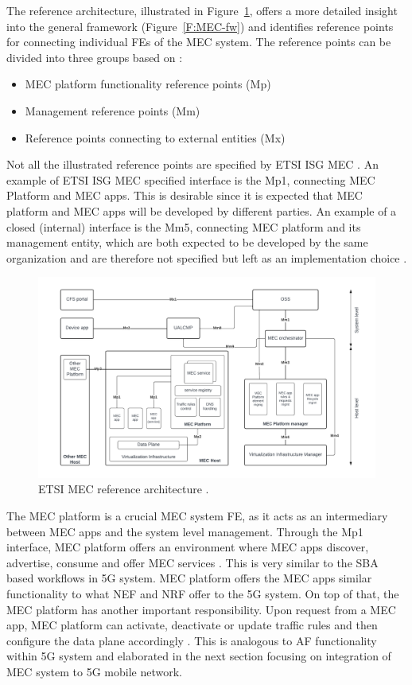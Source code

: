 \documentclass[12pt,a4paper,twoside]{report}
\begin{document}
The reference architecture, illustrated in Figure~\ref{F:MEC-ref-arch}, offers a more detailed insight into the general framework (Figure~\ref{F:MEC-fw}) and identifies reference points for connecting individual FEs of the MEC system. The reference points can be divided into three groups based on \cite{ETSI:GS:MEC003}: 
\begin{itemize}
	\item MEC platform functionality reference points (Mp) 
	\item Management reference points (Mm)
	\item Reference points connecting to external entities (Mx)
\end{itemize}
Not all the illustrated reference points are specified by ETSI ISG MEC \cite{ETSI:GS:MEC003}. An example of ETSI ISG MEC specified interface is the Mp1, connecting MEC Platform and MEC apps. This is desirable since it is expected that MEC platform and MEC apps will be developed by different parties. An example of a closed (internal) interface is the Mm5, connecting MEC platform and its management entity, which are both expected to be developed by the same organization and are therefore not specified but left as an implementation choice \cite{sabella-mec-sw-dev,ETSI:GS:MEC003}. 

\begin{figure}[ht]
	\centering
	\includegraphics[width=\textwidth]{./images/MEC-ref-arch.pdf}
	\caption{ETSI MEC reference architecture \cite{ETSI:GS:MEC003}.}
	\label{F:MEC-ref-arch}
\end{figure}

The MEC platform is a crucial MEC system FE, as it acts as an intermediary between MEC apps and the system level management. Through the Mp1 interface, MEC platform offers an environment where MEC apps discover, advertise, consume and offer MEC services \cite{ETSI:GS:app-ena}. This is very similar to the SBA based workflows in 5G system. MEC platform offers the MEC apps similar functionality to what NEF and NRF offer to the 5G system. On top of that, the MEC platform has another important responsibility. Upon request from a MEC app, MEC platform can activate, deactivate or update traffic rules and then configure the data plane accordingly \cite{ETSI:GS:MEC003}. This is analogous to AF functionality within 5G system and elaborated in the next section focusing on integration of MEC system to 5G mobile network.
\end{document}
